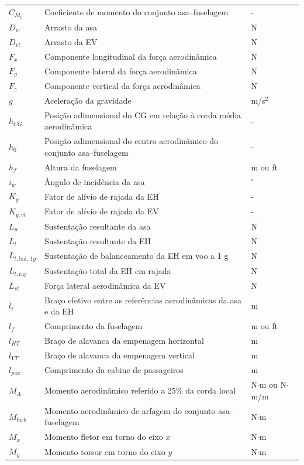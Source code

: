 \begin{longtable}{p{} p{} p{}}
$C_{M_0}$ & Coeficiente de momento do conjunto asa--fuselagem & - \\
$D_w$ & Arrasto da asa & N \\
$D_{vt}$ & Arrasto da EV & N \\
$F_x$ & Componente longitudinal da força aerodinâmica & N \\
$F_y$ & Componente lateral da força aerodinâmica & N \\
$F_z$ & Componente vertical da força aerodinâmica & N \\
$g$ & Aceleração da gravidade & m/s$^2$ \\
$h_{CG}$ & Posição adimensional do CG em relação à corda média aerodinâmica & - \\
$h_0$ & Posição adimensional do centro aerodinâmico do conjunto asa--fuselagem & - \\
$h_f$ & Altura da fuselagem & m ou ft \\
$i_w$ & Ângulo de incidência da asa & $^\circ$ \\
$K_g$ & Fator de alívio de rajada da EH & - \\
$K_{g,vt}$ & Fator de alívio de rajada da EV & - \\
$L_w$ & Sustentação resultante da asa & N \\
$L_t$ & Sustentação resultante da EH & N \\
$L_{t,\mathrm{bal},\,1g}$ & Sustentação de balanceamento da EH em voo a 1 g & N \\
$L_{t,\mathrm{raj}}$ & Sustentação total da EH em rajada & N \\
$L_{vt}$ & Força lateral aerodinâmica da EV & N \\
$\bar{l}_t$ & Braço efetivo entre as referências aerodinâmicas da asa e da EH & m \\
$l_f$ & Comprimento da fuselagem & m ou ft \\
$l_{HT}$ & Braço de alavanca da empenagem horizontal & m \\
$l_{VT}$ & Braço de alavanca da empenagem vertical & m \\
$l_{pax}$ & Comprimento da cabine de passageiros & m \\
$M_A$ & Momento aerodinâmico referido a 25\% da corda local & N$\cdot$m ou N$\cdot$m/m \\
$M_{0wb}$ & Momento aerodinâmico de arfagem do conjunto asa--fuselagem & N$\cdot$m \\
$M_x$ & Momento fletor em torno do eixo $x$ & N$\cdot$m \\
$M_y$ & Momento torsor em torno do eixo $y$ & N$\cdot$m \\

\end{longtable}
